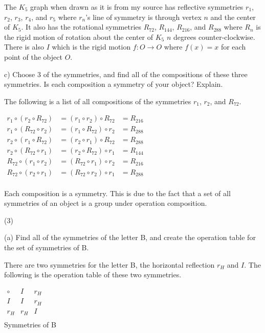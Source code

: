 \documentclass[11pt,a4paper]{article}
\begin{document}
The $K_5$ graph when drawn as it is from my source has reflective symmetries $r_1$, $r_2$, $r_3$, $r_4$, and $r_5$ where $r_n$'s line of symmetry is through vertex $n$ and the center of $K_5$. It also has the rotational symmetries $R_{72}$, $R_{144}$, $R_{216}$, and $R_{288}$ where $R_n$ is the rigid motion of rotation about the center of $K_5$ $n$ degrees counter-clockwise. There is also $I$ which is the rigid motion $f:O\rightarrow O$ where $f(x)=x$ for each point of the object $O$.

c) Choose 3 of the symmetries, and find all of the compositions of these three symmetries. Is each composition a symmetry of your object? Explain.

The following is a list of all compositions of the symmetries $r_1$, $r_2$, and $R_72$.

$
\begin{array}{rll}
r_1\circ (r_2\circ R_{72}) &= (r_1\circ r_2)\circ R_{72} &= R_{216}\\
r_1\circ (R_{72}\circ r_2) &= (r_1\circ R_{72})\circ r_2 &= R_{288}\\
r_2\circ (r_1\circ R_{72}) &=  (r_2\circ r_1)\circ R_{72} &= R_{288}\\
r_2\circ (R_{72}\circ r_1) &= (r_2\circ R_{72})\circ r_1 &= R_{144}\\
R_{72}\circ (r_1\circ r_2) &= (R_{72}\circ r_1)\circ r_2 &= R_{216}\\
R_{72}\circ (r_2\circ r_1) &= (R_{72}\circ r_2)\circ r_1 &= R_{288}\\
\end{array}
$

Each composition is a symmetry. This is due to the fact that a set of all symmetries of an object is a group under operation composition.

(3) 

(a) Find all of the symmetries of the letter B, and create the operation table
for the set of symmetries of B.

There are two symmetries for the letter B, the horizontal reflection $r_H$ and $I$. The following is the operation table of these two symmetries.
\begin{center}
$
\begin{array}{c|c|c}
\circ & I & r_H \\\hline
I & I & r_H \\\hline
r_H & r_H & I \\
\end{array}
$\\
Symmetries of B
\end{center}
\end{document}

